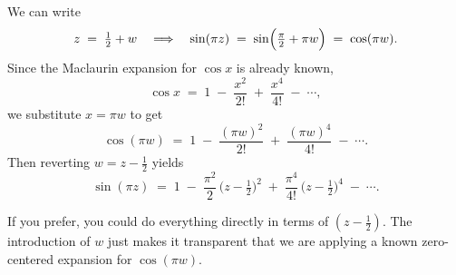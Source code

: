 \documentclass[12pt]{article}
\theoremstyle{definition} %
\theoremstyle{plain} %
\begin{document}
We can write
\[
   z
   \;=\;
   \tfrac12 + w
   \quad\Longrightarrow\quad
   \sin(\pi z)
   \;=\;
   \sin\Bigl(\tfrac{\pi}{2} + \pi w\Bigr)
   \;=\;
   \cos(\pi w).
\]
Since the Maclaurin expansion for $\cos x$ is already known,
\[
   \cos x
   \;=\;
   1
   \;-\;
   \frac{x^2}{2!}
   \;+\;
   \frac{x^4}{4!}
   \;-\;\cdots,
\]
we substitute $x = \pi w$ to get
\[
   \cos(\pi w)
   \;=\;
   1
   \;-\;
   \frac{(\pi w)^2}{2!}
   \;+\;
   \frac{(\pi w)^4}{4!}
   \;-\;\cdots.
\]
Then reverting $w = z - \tfrac12$ yields
\[
   \sin(\pi z)
   \;=\;
   1
   \;-\;
   \frac{\pi^2}{2}
   \,\bigl(z - \tfrac12\bigr)^2
   \;+\;
   \frac{\pi^4}{4!}
   \,\bigl(z - \tfrac12\bigr)^4
   \;-\;\cdots.
\]

If you prefer, you could do everything directly in terms of $(z - \tfrac12)$. The introduction of $w$ just makes it transparent that we are applying a known zero-centered expansion for $\cos(\pi w)$.
\end{document}

